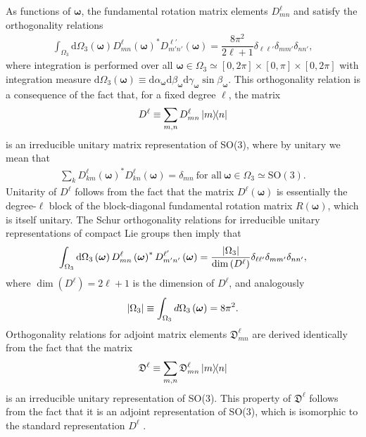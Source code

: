 \documentclass[nofootinbib,notitlepage,twocolumn]{revtex4-2}
\renewcommand{\t}{\text} %
\newcommand{\f}[2]{\dfrac{#1}{#2}} %
\newcommand{\p}[1]{\left(#1\right)} %
\renewcommand{\v}{\bm} %
\newcommand{\1}{\mathds{1}}
\newcommand{\D}{\mathfrak{D}}
\renewcommand{\d}{\text{d}}
\newcommand{\SO}{\text{SO}}
\begin{document}
As functions of $\v\omega$, the fundamental rotation matrix elements $D_{mn}^\ell$ and satisfy the orthogonality relations \cite{brown2003rotational}
\begin{align}
  \int_{\Omega_3} \d\Omega_3\p{\v\omega}
  D^{\ell}_{mn}\p{\v\omega}^* D^{\ell'}_{m'n'}\p{\v\omega}
  = \f{8\pi^2}{2\ell+1} \delta_{\ell\ell'} \delta_{mm'} \delta_{nn'},
  \label{eq:orthogonal}
\end{align}
where integration is performed over all $\v\omega\in\Omega_3\simeq[0,2\pi]\times[0,\pi]\times[0,2\pi]$ with integration measure $\d\Omega_3\p{\v\omega}\equiv\d\alpha_{\v\omega} \d\beta_{\v\omega} \d\gamma_{\v\omega} \sin\beta_{\v\omega}$.
This orthogonality relation is a consequence of the fact that, for a fixed degree $\ell$, the matrix
\begin{align}
  D^\ell \equiv \sum_{m,n} D^\ell_{mn} \op{m}{n}
\end{align}
is an irreducible unitary matrix representation of SO(3), where by unitary we mean that
\begin{align}
  \sum_k D^\ell_{km}\p{\v\omega}^* D^\ell_{kn}\p{\v\omega} = \delta_{mn}
  ~\t{for all}~\v\omega\in\Omega_3\simeq\SO(3).
\end{align}
Unitarity of $D^\ell$ follows from the fact that the matrix $D^\ell\p{\v\omega}$ is essentially the degree-$\ell$ block of the block-diagonal fundamental rotation matrix $R\p{\v\omega}$, which is itself unitary.
The Schur orthogonality relations for irreducible unitary representations of compact Lie groups then imply that \cite{cornwell1997group}
\begin{align}
  \int_{\Omega_3} \d\Omega_3\p{\v\omega}
  D^{\ell}_{mn}\p{\v\omega}^* D^{\ell'}_{m'n'}\p{\v\omega}
  = \f{\abs{\Omega_3}}{\dim\p{D^\ell}}
  \delta_{\ell\ell'} \delta_{mm'} \delta_{nn'},
\end{align}
where $\dim\p{D^\ell}=2\ell+1$ is the dimension of $D^\ell$, and analogously
\begin{align}
  \abs{\Omega_3} \equiv \int_{\Omega_3} d\Omega_3\p{\v\omega} = 8\pi^2.
\end{align}
Orthogonality relations for adjoint matrix elements $\D^\ell_{mn}$ are derived identically from the fact that the matrix
\begin{align}
  \D^\ell \equiv \sum_{m,n} \D^\ell_{mn} \op{m}{n}
\end{align}
is an irreducible unitary representation of SO(3).
This property of $\D^\ell$ follows from the fact that it is an adjoint representation of SO(3), which is isomorphic to the standard representation $D^\ell$ \cite{hall2015lie}.
\end{document}

